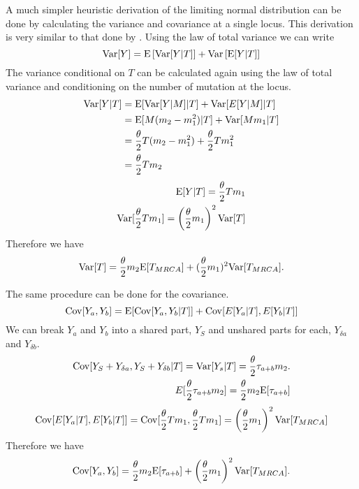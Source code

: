 A much simpler heuristic derivation of the limiting normal distribution can be
done by calculating the variance and covariance at a single locus. This
derivation is very similar to that done by \citet{Schraiber2015}. Using the law
of total variance we can write
\begin{equation*}
  \mathrm{Var}[Y] = \mathrm{E}\left[\mathrm{Var}[Y|T]\right] +
  \mathrm{Var}\left[\mathrm{E}[Y|T]\right]
\end{equation*}
The variance conditional on $T$ can be calculated again using the law of total
variance and conditioning on the number of mutation at the locus. 
\begin{align*}
  \mathrm{Var}[Y|T] &= \mathrm{E}[\mathrm{Var}[Y|M]|T] + \mathrm{Var}[E[Y|M]|T]\\
            &= \mathrm{E}[M(m_2-m_1^2)|T] + \mathrm{Var}[Mm_1|T]\\
            &= \frac{\theta}{2} T (m_2-m_1^2) + \frac{\theta}{2} T m_1^2\\
            &= \frac{\theta}{2} T m_2
\end{align*}
\begin{align*}
  \mathrm{E}[Y|T] = \frac{\theta}{2} T m_1\\
  \mathrm{Var}[\frac{\theta}{2} T m_1] = \left( \frac{\theta}{2} m_1\right)^2\mathrm{Var}[T]
\end{align*}
Therefore we have
\begin{equation}
  \mathrm{Var}[T] = \frac{\theta}{2} m_2 \mathrm{E}[T_{MRCA}] + (\frac{\theta}{2} m_1)^2 \mathrm{Var}[T_{MRCA}].
\end{equation}

The same procedure can be done for the covariance.
\begin{equation*}
  \mathrm{Cov}[Y_a,Y_b] = \mathrm{E}[\mathrm{Cov}[Y_a,Y_b|T]] + \mathrm{Cov}[E[Y_a|T],E[Y_b|T]]
\end{equation*}
We can break $Y_a$ and $Y_b$ into a shared part, $Y_S$ and unshared parts for
each, $Y_{\delta a}$ and $Y_{\delta b}$.
\begin{align*}
  \mathrm{Cov}[Y_S + Y_{\delta a}, Y_S + Y_{\delta b}|T] = \mathrm{Var}[Y_s|T] = \frac{\theta}{2} \tau_{a+b} m_2.\\
  E[\frac{\theta}{2} \tau_{a+b} m_2] = \frac{\theta}{2} m_2\mathrm{E}[\tau_{a+b}]
\end{align*}
\begin{align*}
  \mathrm{Cov}[E[Y_a|T],E[Y_b|T]] = \mathrm{Cov}[\frac{\theta}{2} T m_1, \frac{\theta}{2} T m_1] = \left( \frac{\theta}{2} m_1 \right)^2\mathrm{Var}[T_{MRCA}]
\end{align*}
Therefore we have
\begin{equation}
  \mathrm{Cov}[Y_a,Y_b] = \frac{\theta}{2} m_2 \mathrm{E}[\tau_{a+b}] + \left( \frac{\theta}{2} m_1 \right)^2 \mathrm{Var}[T_{MRCA}].
\end{equation}

